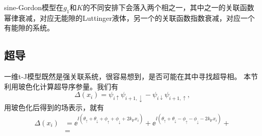 sine-Gordon模型在$g_1$和$K$的不同安排下会落入两个相之一，其中之一的关联函数幂律衰减，对应无能隙的Luttinger液体，另一个的关联函数指数衰减，对应一个有能隙的系统。

\subsection{超导}

一维t-J模型既然是强关联系统，很容易想到，是否可能在其中寻找超导相。
本节利用玻色化计算超导序参量。我们有
\begin{equation}
    \Delta(x_i) = \psi_{i \uparrow} \psi_{i+1, \downarrow} - \psi_{i \downarrow} \psi_{i+1, \uparrow},
\end{equation}
用玻色化后得到的场表示，就有
\begin{equation}
    \begin{aligned}
        \Delta(x_i) &= \ee^{\ii (\theta_\uparrow + \theta_\downarrow + \phi_\uparrow + \phi_\downarrow + 2 k_\text{F} x_i)} + \ee^{\ii (\theta_\uparrow + \theta_\downarrow - \phi_\uparrow - \phi_\downarrow - 2 k_\text{F} x_i)} + \\
        &= 
    \end{aligned}
\end{equation}
